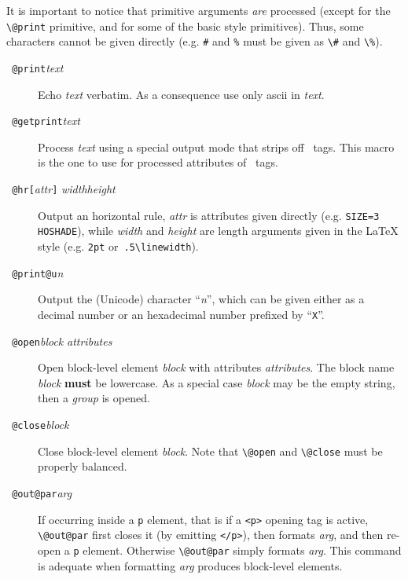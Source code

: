 It is important to notice that primitive arguments \emph{are}
processed (except for the \verb+\@print+ primitive, and for some of
the basic style primitives). Thus,
some characters cannot be given directly (e.g. \verb+#+ and
\verb+%+ must be given as \verb+\#+ and \verb+\%+).
\begin{description}
\item[{\tt{} @print}{\it text}{\tt{}}]
Echo \textit{text} verbatim. As a consequence use only ascii
in \textit{text}.
\item[{\tt{} @getprint}{\it text}{\tt{}}]
Process \textit{text} using a special output mode that strips off
\html~tags. This macro is the one to use for processed attributes of
\html~tags.
\item[{\tt{} @hr[}{\it attr}{\tt]}{\it
width}{\tt{}}{\it height}{\tt{}}]
Output an \html{} horizontal rule, \textit{attr} is attributes given
directly (e.g. \verb+SIZE=3 HOSHADE+), while \textit{width} and
\textit{height} are length arguments given in the \LaTeX{} style
(e.g. \verb+2pt+ or~\verb+.5\linewidth+).
\item[{\tt{} @print@u}{\it n}{\tt{}}]
Output the (Unicode) character ``\textit{n}'', which can
be given either as a decimal number or an hexadecimal number prefixed
by ``\texttt{X}''.

\item[{\tt{} @open}{\it block}{\tt{}}{\it
attributes}{\tt{}}]
Open \html{} block-level element \textit{block} with attributes
\textit{attributes}. The block name \textit{block} \textbf{must} be
lowercase.
As a special case \textit{block} may be the empty string, then a \html{}
\emph{group} is opened.
\item[{\tt{} @close}{\it block}{\tt{}}]
Close \html{} block-level element \textit{block}.
Note that \verb+\@open+ and \verb+\@close+ must be properly balanced.
\item[{\tt{} @out@par}{\it arg}{\tt{}}]
If occurring inside a \verb+p+ element,
that is if a \verb+<p>+ opening tag is active,
\verb+\@out@par+  first closes it (by emitting \verb+</p>+),
then formats \textit{arg}, and then re-open a \verb+p+ element.
Otherwise \verb+\@out@par+ simply formats \textit{arg}.
This command is adequate when
formatting \textit{arg} produces block-level elements.
\end{description}

